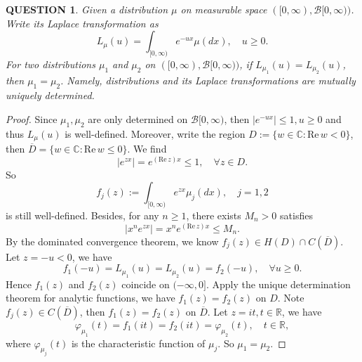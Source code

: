 \documentclass[12pt]{article}
\renewcommand{\b}{\mathscr{B}}
\renewcommand{\(}{\left(}%
\renewcommand{\)}{\right)}%
\renewcommand{\[}{\left[}%
\renewcommand{\]}{\right]}%
\renewcommand{\r}{\mathbb{R}}
\renewcommand{\c}{\mathbb{C}}
\newtheorem{question}{QUESTION}[section]}
\newtheorem{proof}{Proof.}}
\begin{document}
   \begin{question}
   	Given a distribution $\mu$ on measurable space $([0,\infty),\b[0,\infty))$. Write its Laplace transformation as 
   	\begin{equation*}
   		L_\mu(u)=\int_{[0,\infty)}e^{-ux}\mu(dx),\quad u\geq 0.
   	\end{equation*}
   	For two distributions $\mu_1$ and $\mu_2$ on $([0,\infty),\b[0,\infty))$, if $L_{\mu_1}(u)=L_{\mu_2}(u)$, then $\mu_1=\mu_2$. Namely, distributions and its Laplace transformations are mutually uniquely determined.
   \end{question}
   \begin{proof}
   	Since $\mu_1,\mu_2$ are only determined on $\b[0,\infty)$, then $|e^{-ux}|\leq 1,u\geq 0$ and thus $L_\mu(u)$ is well-defined. Moreover, write the region $D:=\{w\in\c:\text{Re}\, w< 0\}$, then $\overline{D}=\{w\in\c:\text{Re}\, w\leq 0\}$. We find 
   	\begin{equation*}
   		|e^{zx}|=e^{(\mathrm{Re}\,z)x}\leq 1,\quad \forall z\in D.
   	\end{equation*}
   	 So
   	\begin{equation*}
   		f_j(z):=\int_{[0,\infty)}e^{zx}\mu_j(dx),\quad j=1,2
   	\end{equation*} 
   	is still well-defined. Besides, for any $n\geq 1$, there exists $M_n>0$ satisfies
   	\begin{equation*}
   		|x^ne^{zx}|=x^ne^{(\mathrm{Re}\,z)x}\leq M_n.
   	\end{equation*}
   	By the dominated convergence theorem, we know $f_j(z)\in H(D)\cap C(\overline{D})$. Let $z=-u<0$, we have
   	\begin{equation*}
   		f_1(-u)=L_{\mu_1}(u)=L_{\mu_2}(u)=f_2(-u),\quad \forall u\geq 0.
   	\end{equation*}
   	Hence $f_1(z)$ and $f_2(z)$ coincide on $(-\infty,0]$. Apply the unique determination theorem for analytic functions, we have $f_1(z)=f_2(z)$ on $D$. Note $f_j(z)\in C(\overline{D})$, then $f_1(z)=f_2(z)$ on $\overline{D}$. Let $z=it,t\in\r$, we have 
   	\begin{equation*}
   		\varphi_{\mu_1}(t)=f_1(it)=f_2(it)=\varphi_{\mu_2}(t),\quad t\in\r,
   	\end{equation*}
   	where $\varphi_{\mu_j}(t)$ is the characteristic function of $\mu_j$. So $\mu_1=\mu_2$.
   \end{proof}
   
\end{document}
